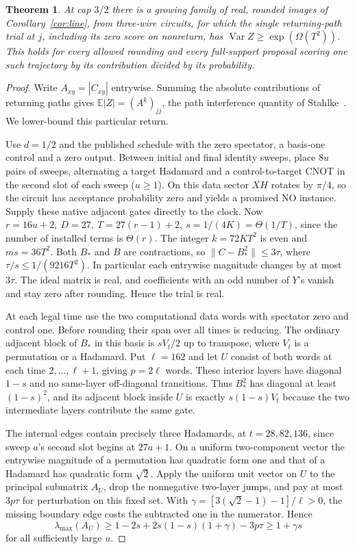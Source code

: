 \documentclass[11pt]{article}
\newtheorem{theorem}{Theorem}
\begin{document}
\begin{theorem}\label{thm:twostep}
At cap \(3/2\) there is a growing family of real, rounded images of Corollary~\ref{cor:line}, from three-wire circuits, for which the single returning-path trial at \(j\), including its zero score on nonreturn, has \(\operatorname{Var}Z\ge\exp(\Omega(T^2))\). This holds for every allowed rounding and every full-support proposal scoring one such trajectory by its contribution divided by its probability.
\end{theorem}
\begin{proof}
Write \(A_{xy}=|C_{xy}|\) entrywise. Summing the absolute contributions of returning paths gives \(\mathbb E|Z|=(A^k)_{jj}\), the path interference quantity of Stahlke~\cite{stahlke}. We lower-bound this particular return.

Use \(d=1/2\) and the published schedule with the zero spectator, a basis-one control and a zero output. Between initial and final identity sweeps, place \(8u\) pairs of sweeps, alternating a target Hadamard and a control-to-target CNOT in the second slot of each sweep (\(u\ge1\)). On this data sector \(XH\) rotates by \(\pi/4\), so the circuit has acceptance probability zero and yields a promised NO instance. Supply these native adjacent gates directly to the clock. Now \(r=16u+2,\ D=27,\ T=27(r-1)+2,\ s=1/(4K)=\Theta(1/T)\), since the number of installed terms is \(\Theta(r)\). The integer \(k=72KT^2\) is even and \(ms=36T^2\). Both \(B_*\) and \(B\) are contractions, so \(\|C-B_*^2\|\le3\tau\), where \(\tau/s\le1/(9216T^2)\). In particular each entrywise magnitude changes by at most \(3\tau\). The ideal matrix is real, and coefficients with an odd number of \(Y\)'s vanish and stay zero after rounding. Hence the trial is real.

At each legal time use the two computational data words with spectator zero and control one. Before rounding their span over all times is reducing. The ordinary adjacent block of \(B_*\) in this basis is \(sV_t/2\) up to transpose, where \(V_t\) is a permutation or a Hadamard. Put \(\ell=162\) and let \(U\) consist of both words at each time \(2,\ldots,\ell+1\), giving \(p=2\ell\) words. These interior layers have diagonal \(1-s\) and no same-layer off-diagonal transitions. Thus \(B_*^2\) has diagonal at least \((1-s)^2\), and its adjacent block inside \(U\) is exactly \(s(1-s)V_t\) because the two intermediate layers contribute the same gate.

The internal edges contain precisely three Hadamards, at \(t=28,82,136\), since sweep \(a\)'s second slot begins at \(27a+1\). On a uniform two-component vector the entrywise magnitude of a permutation has quadratic form one and that of a Hadamard has quadratic form \(\sqrt2\). Apply the uniform unit vector on \(U\) to the principal submatrix \(A_U\), drop the nonnegative two-layer jumps, and pay at most \(3p\tau\) for perturbation on this fixed set. With \(\gamma=[3(\sqrt2-1)-1]/\ell>0\), the missing boundary edge costs the subtracted one in the numerator. Hence
\[
 \lambda_{\max}(A_U)\ge 1-2s+2s(1-s)(1+\gamma)-3p\tau\ge 1+\gamma s
\]
for all sufficiently large \(u\).


\end{proof}
\end{document}
